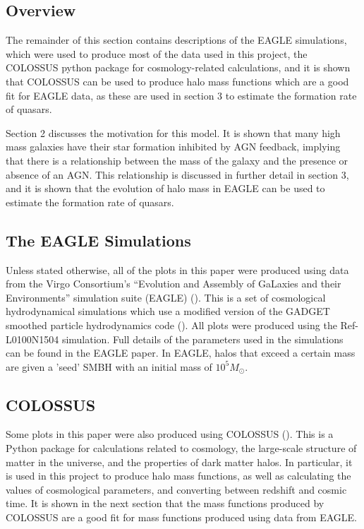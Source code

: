 \documentclass[12pt, twocolumn]{report}%
\begin{document}
\subsection{Overview}

The remainder of this section contains descriptions of the EAGLE simulations, which were used to produce most of the data used in this project, the COLOSSUS python package for cosmology-related calculations, and it is shown that COLOSSUS can be used to produce halo mass functions which are a good fit for EAGLE data, as these are used in section 3 to estimate the formation rate of quasars.\par

Section 2 discusses the motivation for this model. It is shown that many high mass galaxies have their star formation inhibited by AGN feedback, implying that there is a relationship between the mass of the galaxy and the presence or absence of an AGN. This relationship is discussed in further detail in section 3, and it is shown that the evolution of halo mass in EAGLE can be used to estimate the formation rate of quasars.

\subsection{The EAGLE Simulations}

Unless stated otherwise, all of the plots in this paper were produced using data from the Virgo Consortium’s “Evolution and Assembly of GaLaxies and their Environments” simulation suite (EAGLE) (\cite{EAGLE}). This is a set of cosmological hydrodynamical simulations which use a modified version of the GADGET smoothed particle hydrodynamics code (\cite{GADGET}). All plots were produced using the Ref-L0100N1504 simulation. Full details of the parameters used in the simulations can be found in the EAGLE paper. In EAGLE, halos that exceed a certain mass are given a 'seed' SMBH with an initial mass of $10^5M_\odot$.

\subsection{COLOSSUS}

Some plots in this paper were also produced using COLOSSUS (\cite{COLOSSUS}). This is a Python package for calculations related to cosmology, the large-scale structure of matter in the universe, and the properties of dark matter halos. In particular, it is used in this project to produce halo mass functions, as well as calculating the values of cosmological parameters, and converting between redshift and cosmic time. It is shown in the next section that the mass functions produced by COLOSSUS are a good fit for mass functions produced using data from EAGLE.
\end{document}
